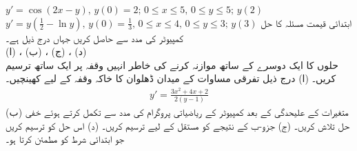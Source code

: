 $y'=\cos(2x-y),\, y(0)=2;\, 0\le x\le 5,\, 0\le y\le 5;\, y(2)$
$y'=y(\tfrac{1}{2}-\ln y),\, y(0)=\tfrac{1}{3},\, 0\le x\le 4,\, 0\le y\le 3;\, y(3)$
ابتدائی قیمت مسئلہ  کا حل کمپیوٹر کی مدد سے حاصل کریں جہاں  درج ذیل ہے۔\\
(ا) ، (ب) ، (ج) ، (د)  \\
 حلوں کا ایک دوسرے کے ساتھ موازنہ کرنے کی خاطر انہیں وقفہ  پر ایک ساتھ ترسیم کریں۔
(ا) درج ذیل تفرقی مساوات کے میدان ڈھلوان کا خاکہ وقفہ  کے لیے  کھینچیں۔
\begin{align*}
y'=\frac{3x^2+4x+2}{2(y-1)}
\end{align*}
(ب) متغیرات کے  علیحدگی کے بعد کمپیوٹر کے ریاضیاتی  پروگرام کی مدد سے تکمل کرتے ہوئے خفی حل تلاش کریں۔ (ج) جزو-ب کے نتیجے کو مستقل  کے لیے  ترسیم کریں۔ (د) اس حل کو ترسیم کریں جو ابتدائی شرط  کو مطمئن کرتا ہو۔

